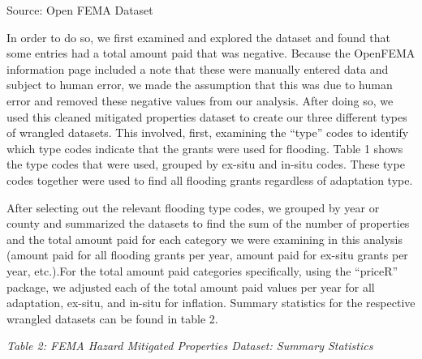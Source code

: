 \documentclass[
  12pt,
]{article}
\begin{document}
\begin{minipage}{\linewidth}
Source: Open FEMA Dataset\\
\end{minipage}

In order to do so, we first examined and explored the dataset and found
that some entries had a total amount paid that was negative. Because the
OpenFEMA information page included a note that these were manually
entered data and subject to human error, we made the assumption that
this was due to human error and removed these negative values from our
analysis. After doing so, we used this cleaned mitigated properties
dataset to create our three different types of wrangled datasets. This
involved, first, examining the ``type'' codes to identify which type
codes indicate that the grants were used for flooding. Table 1 shows the
type codes that were used, grouped by ex-situ and in-situ codes. These
type codes together were used to find all flooding grants regardless of
adaptation type.

After selecting out the relevant flooding type codes, we grouped by year
or county and summarized the datasets to find the sum of the number of
properties and the total amount paid for each category we were examining
in this analysis (amount paid for all flooding grants per year, amount
paid for ex-situ grants per year, etc.).For the total amount paid
categories specifically, using the ``priceR'' package, we adjusted each
of the total amount paid values per year for all adaptation, ex-situ,
and in-situ for inflation. Summary statistics for the respective
wrangled datasets can be found in table 2.

\emph{Table 2: FEMA Hazard Mitigated Properties Dataset: Summary
Statistics}\\
\captionsetup[table]{labelformat=empty,skip=1pt}
\setlength{\LTpost}{0mm}
\end{document}
